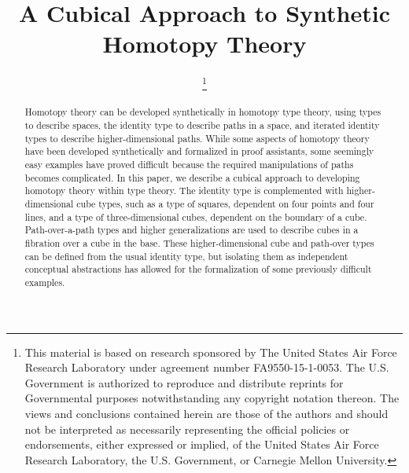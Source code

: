\documentclass[conference, compsocconf]{drl-common/IEEEtran}
\begin{document}
\title{A Cubical Approach to Synthetic Homotopy Theory}

\author{
\and
{}

\thanks{
This material is based on research sponsored by The United States Air
Force Research Laboratory under agreement number FA9550-15-1-0053. The
U.S. Government is authorized to reproduce and distribute reprints for
Governmental purposes notwithstanding any copyright notation thereon.
The views and conclusions contained herein are those of the authors and
should not be interpreted as necessarily representing the official
policies or endorsements, either expressed or implied, of the United
States Air Force Research Laboratory, the U.S. Government, or Carnegie
Mellon University.
}

}

\maketitle

\begin{abstract}
Homotopy theory can be developed synthetically in homotopy type theory,
using types to describe spaces, the identity type to describe paths in a
space, and iterated identity types to describe higher-dimensional paths.
While some aspects of homotopy theory have been developed synthetically
and formalized in proof assistants, some seemingly easy
examples have proved difficult because the required manipulations of
paths becomes complicated.  In this paper, we describe a cubical
approach to developing homotopy theory within type theory.  The identity
type is complemented with higher-dimensional cube types, such as a type
of squares, dependent on four points and four lines, and a type of
three-dimensional cubes, dependent on the boundary of a cube.
Path-over-a-path types and higher generalizations are used to describe
cubes in a fibration over a cube in the base.  These higher-dimensional
cube and path-over types can be defined from the usual identity type,
but isolating them as independent conceptual abstractions has allowed
for the formalization of some previously difficult examples.
\end{abstract}
\end{document}
